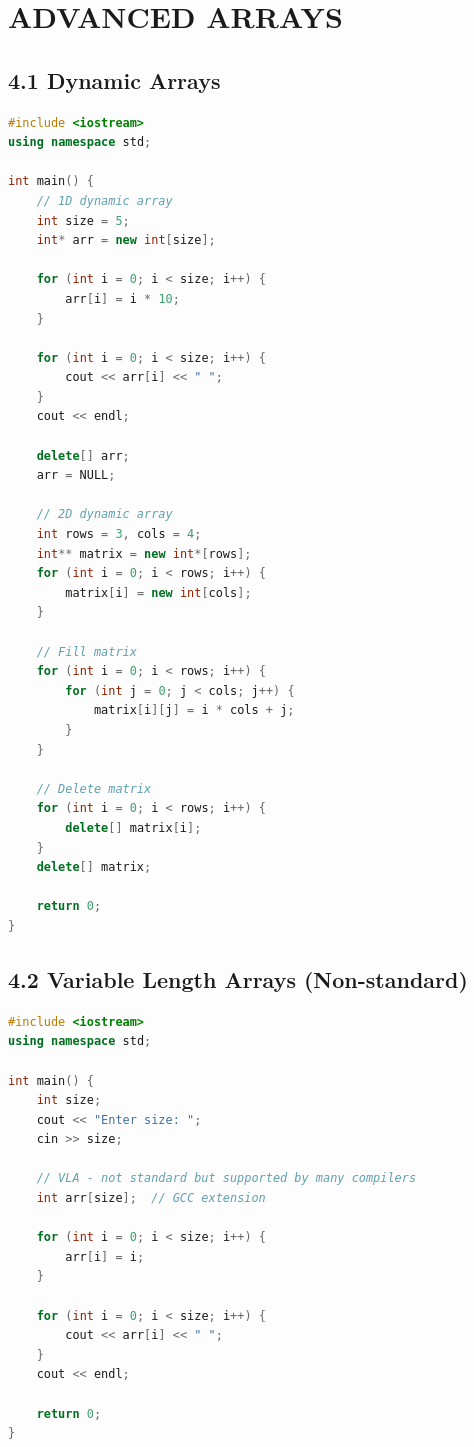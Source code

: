 \hypertarget{advanced-arrays}{%
\section{ADVANCED ARRAYS}\label{advanced-arrays}}

\hypertarget{dynamic-arrays}{%
\subsection{4.1 Dynamic Arrays}\label{dynamic-arrays}}

\begin{lstlisting}[language={C++}]
#include <iostream>
using namespace std;

int main() {
    // 1D dynamic array
    int size = 5;
    int* arr = new int[size];

    for (int i = 0; i < size; i++) {
        arr[i] = i * 10;
    }

    for (int i = 0; i < size; i++) {
        cout << arr[i] << " ";
    }
    cout << endl;

    delete[] arr;
    arr = NULL;

    // 2D dynamic array
    int rows = 3, cols = 4;
    int** matrix = new int*[rows];
    for (int i = 0; i < rows; i++) {
        matrix[i] = new int[cols];
    }

    // Fill matrix
    for (int i = 0; i < rows; i++) {
        for (int j = 0; j < cols; j++) {
            matrix[i][j] = i * cols + j;
        }
    }

    // Delete matrix
    for (int i = 0; i < rows; i++) {
        delete[] matrix[i];
    }
    delete[] matrix;

    return 0;
}
\end{lstlisting}

\hypertarget{variable-length-arrays-non-standard}{%
\subsection{4.2 Variable Length Arrays
(Non-standard)}\label{variable-length-arrays-non-standard}}

\begin{lstlisting}[language={C++}]
#include <iostream>
using namespace std;

int main() {
    int size;
    cout << "Enter size: ";
    cin >> size;

    // VLA - not standard but supported by many compilers
    int arr[size];  // GCC extension

    for (int i = 0; i < size; i++) {
        arr[i] = i;
    }

    for (int i = 0; i < size; i++) {
        cout << arr[i] << " ";
    }
    cout << endl;

    return 0;
}
\end{lstlisting}

